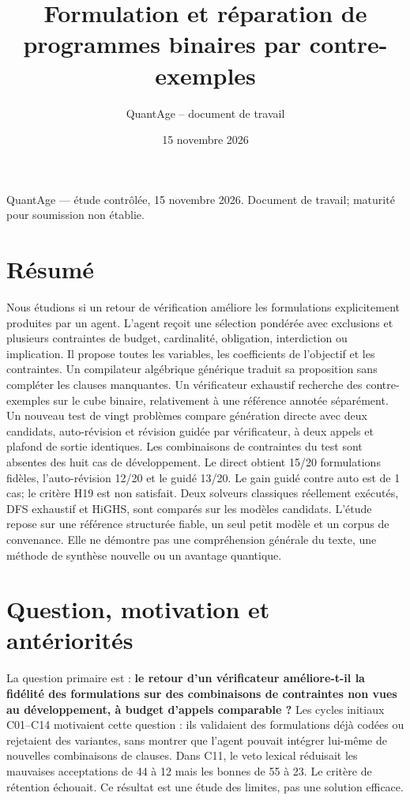 \documentclass[11pt]{article}
\title{Formulation et réparation de programmes binaires par contre-exemples}
\author{QuantAge -- document de travail}
\date{15 novembre 2026}
\begin{document}
\maketitle

QuantAge — étude contrôlée, 15 novembre 2026. Document de travail; maturité pour soumission non établie.

\section{Résumé}

Nous étudions si un retour de vérification améliore les formulations explicitement produites par un agent. L'agent reçoit une sélection pondérée avec exclusions et plusieurs contraintes de budget, cardinalité, obligation, interdiction ou implication. Il propose toutes les variables, les coefficients de l'objectif et les contraintes. Un compilateur algébrique générique traduit sa proposition sans compléter les clauses manquantes. Un vérificateur exhaustif recherche des contre-exemples sur le cube binaire, relativement à une référence annotée séparément. Un nouveau test de vingt problèmes compare génération directe avec deux candidats, auto-révision et révision guidée par vérificateur, à deux appels et plafond de sortie identiques. Les combinaisons de contraintes du test sont absentes des huit cas de développement. Le direct obtient 15/20 formulations fidèles, l'auto-révision 12/20 et le guidé 13/20. Le gain guidé contre auto est de 1 cas; le critère H19 est non satisfait. Deux solveurs classiques réellement exécutés, DFS exhaustif et HiGHS, sont comparés sur les modèles candidats. L'étude repose sur une référence structurée fiable, un seul petit modèle et un corpus de convenance. Elle ne démontre pas une compréhension générale du texte, une méthode de synthèse nouvelle ou un avantage quantique.

\section{Question, motivation et antériorités}

La question primaire est : \textbf{le retour d'un vérificateur améliore-t-il la fidélité des formulations sur des combinaisons de contraintes non vues au développement, à budget d'appels comparable ?} Les cycles initiaux C01–C14 motivaient cette question : ils validaient des formulations déjà codées ou rejetaient des variantes, sans montrer que l'agent pouvait intégrer lui-même de nouvelles combinaisons de clauses. Dans C11, le veto lexical réduisait les mauvaises acceptations de 44 à 12 mais les bonnes de 55 à 23. Le critère de rétention échouait. Ce résultat est une étude des limites, pas une solution efficace.
\end{document}
